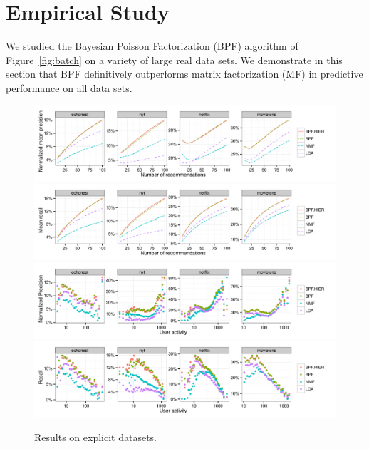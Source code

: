 \section{Empirical Study}
We studied the Bayesian Poisson Factorization (BPF) algorithm of
Figure~\ref{fig:batch} on a variety of large real data sets. We
demonstrate in this section that BPF definitively outperforms matrix
factorization (MF) in predictive performance on all data sets.

\begin{figure}[th]
\centering
\includegraphics[width=\textwidth]{./figures/explicit/meanprecision.pdf}\\               
\includegraphics[width=\textwidth]{./figures/explicit/meanrecall.pdf}\\               
\includegraphics[width=\textwidth]{./figures/explicit/useractivity-precision.pdf}\\
\includegraphics[width=\textwidth]{./figures/explicit/useractivity-recall.pdf}\\
\caption{Results on explicit datasets.}
\label{fig:precision_by_M}
\end{figure}

